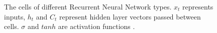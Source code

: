 \begin{figure}[ht!]
    \centering
    \qquad
    \qquad
    \qquad
    \caption{The cells of different Recurrent Neural Network types. $x_t$ represents inputs, $h_t$ and $C_t$ represent hidden layer vectors passed between cells. $\sigma$ and $tanh$ are activation functions \cite{lopez_rnn_nodate}.
    \label{fig:RNNs}}
\end{figure}


